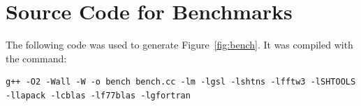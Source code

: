 \documentclass[12pt]{article}
\begin{document}
\section{Source Code for Benchmarks}
\label{sec:benchsrc}

The following code was used to generate Figure~\ref{fig:bench}. It was compiled with the
command:
\scriptsize
\begin{verbatim}
g++ -O2 -Wall -W -o bench bench.cc -lm -lgsl -lshtns -lfftw3 -lSHTOOLS -llapack -lcblas -lf77blas -lgfortran
\end{verbatim}


\end{document}
